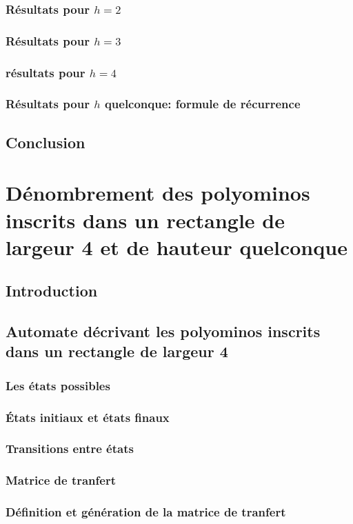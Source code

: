\documentclass[12pt]{memoireuqam1.3}
\begin{document}
\subsection{Résultats pour $h=2$}
\subsection{Résultats pour $h=3$}
\subsection{résultats pour $h=4$}
\subsection{Résultats pour $h$ quelconque: formule de récurrence }
\section*{Conclusion}
\chapter{Dénombrement des polyominos inscrits dans un rectangle de largeur 4 et de hauteur quelconque}
\section*{Introduction}
\section{Automate décrivant les polyominos inscrits dans un rectangle de largeur 4}
\subsection{Les états possibles}
\subsection{États initiaux et états finaux}
\subsection{Transitions entre états}
\subsection{Matrice de tranfert}
\subsection{Définition et génération de la matrice de tranfert}
\end{document}
